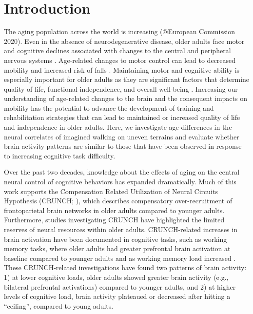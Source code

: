 \documentclass[a4paper,fleqn]{cas-sc}
\begin{document}
\section{Introduction}
The aging population across the world is increasing (@European Commission 2020). Even in the absence of neurodegenerative disease, older adults face motor and cognitive declines associated with changes to the central and peripheral nervous systems \citep{Seidler2010}. Age-related changes to motor control can lead to decreased mobility and increased risk of falls \citep{Manini2017, Lord1994}. Maintaining motor and cognitive ability is especially important for older adults as they are significant factors that determine quality of life, functional independence, and overall well-being \citep{Hardy2011, Gabrieli2012, Knaggs2011}. Increasing our understanding of age-related changes to the brain and the consequent impacts on mobility has the potential to advance the development of training and rehabilitation strategies that can lead to maintained or increased quality of life and independence in older adults. Here, we investigate age differences in the neural correlates of imagined walking on uneven terrains and evaluate whether brain activity patterns are similar to those that have been observed in response to increasing cognitive task difficulty.

Over the past two decades, knowledge about the effects of aging on the central neural control of cognitive behaviors has expanded dramatically. Much of this work supports the Compensation Related Utilization of Neural Circuits Hypothesis (CRUNCH; \citep{Reuter2008}), which describes compensatory over-recruitment of frontoparietal brain networks in older adults compared to younger adults. Furthermore, studies investigating CRUNCH have highlighted the limited reserves of neural resources within older adults. CRUNCH-related increases in brain activation have been documented in cognitive tasks, such as working memory tasks, where older adults had greater prefrontal brain activation at baseline compared to younger adults and as working memory load increased \citep{Cappell2010, Reuter2008, Iordan2020, Schneider2010}. These CRUNCH-related investigations have found two patterns of brain activity: 1) at lower cognitive loads, older adults showed greater brain activity (e.g., bilateral prefrontal activations) compared to younger adults, and 2) at higher levels of cognitive load, brain activity plateaued or decreased after hitting a “ceiling”, compared to young adults.
\end{document}
